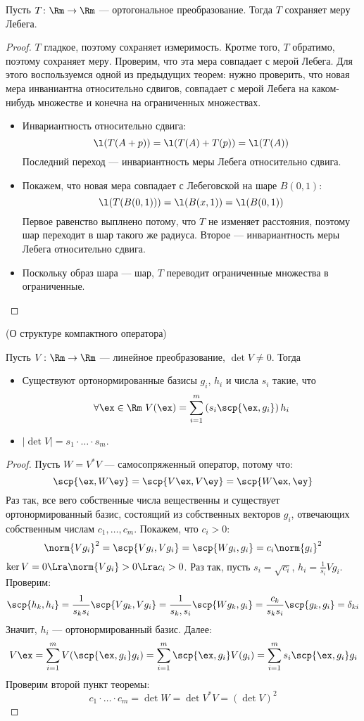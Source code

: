 \begin{theorem}
	Пусть $T \colon \Rm \to \Rm$ --- ортогональное преобразование. Тогда $T$ 
	сохраняет меру Лебега.	
\end{theorem}
\begin{proof}
	$T$ гладкое, поэтому сохраняет измеримость. Кротме того, $T$ обратимо,
	поэтому сохраняет меру.
	Проверим, что эта мера совпадает с мерой Лебега. Для этого 
	воспользуемся одной из предыдущих теорем: нужно проверить, 
	что новая мера инваниантна
	относительно сдвигов, совпадает с мерой Лебега на каком-нибудь множестве и 
	конечна на ограниченных множествах.
	\begin{itemize}
		\item Инвариантность относительно сдвига:
\[
	\l(T(A + p)) = \l(T(A) + T(p)) = \l(T(A))
\]
	Последний переход --- инвариантность меры Лебега относительно сдвига.
		\item Покажем, что новая мера совпадает с Лебеговской на шаре $B(0, 1)$:
\[
	\l(T(B(0, 1))) = \l(B(x, 1)) = \l(B(0, 1))	
\]
	Первое равенство выплнено потому, что $T$ не изменяет расстояния, поэтому шар переходит в шар такого 
	же радиуса. Второе --- инвариантность меры Лебега относительно сдвига.
		\item Поскольку образ шара --- шар, $T$ переводит ограниченные множества в ограниченные.
	\end{itemize}
\end{proof}

\begin{theorem}(О структуре компактного оператора)
	
	Пусть $V \colon \Rm \to \Rm$ --- линейное преобразование, $\det{V} \neq 0$. Тогда
\begin{itemize}
	\item Существуют ортонормированные базисы $g_i$, $h_i$ и числа
		$s_i$ такие, что
\[
	\forall \ex \in \Rm~ V(\ex) = \sum_{i = 1}^{m}{\left(s_i \scp{\ex, g_i}\right)h_i} 
\]
	\item $|\det{V}| = s_1 \cdot \ldots \cdot s_m$.
\end{itemize}
\end{theorem}
\begin{proof}
	Пусть $W = V^*V$ --- самосопряженный оператор, потому что:
\[
	\scp{\ex, W\ey} = \scp{V\ex, V\ey} = \scp{W\ex, \ey}
\]
	Раз так, все вего собственные числа вещественны и существует ортонормированный базис, состоящий из собственных векторов $g_i$, отвечающих
	собственным числам $c_1, \ldots, c_m$. Покажем, что $c_i > 0$:
\[
	\norm{V g_i}^2 = \scp{V g_i, V g_i} = \scp{W g_i, g_i} = c_i \norm{g_i}^2
\]
	$\ker{V} = 0 \Lra \norm{V g_i} > 0 \Lra c_i > 0$. Раз так, пусть $s_i = \sqrt{c_i}$, 
	$\displaystyle h_i = \frac{1}{s_i}V g_i$. Проверим:
\[
	\scp{h_k, h_i} = \frac{1}{s_k s_i} \scp{V g_k, V g_i} = \frac{1}{s_k, s_i} \scp{W g_k, g_i} 
	= \frac{c_k}{s_k s_i} \scp{g_k, g_i} = \delta_{ki}
\]
	Значит, $h_i$ --- ортонормированный базис. Далее:
\[
	V\ex = \sum_{i = 1}^{m}{V(\scp{\ex, g_i} g_i)} = \sum_{i = 1}^{m}{\scp{\ex, g_i} V(g_i)}
	= \sum_{i = 1}^{m}{s_i \scp{\ex, g_i} g_i}
\]
	Проверим второй пункт теоремы:
\[
	c_1 \cdot \ldots \cdot c_m = \det{W} = \det{V^*V} = (\det{V})^2
\]
\end{proof}


